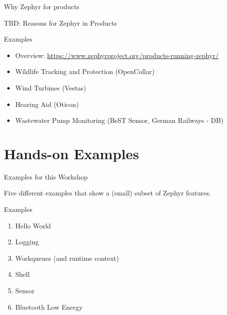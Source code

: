 \documentclass[10pt, aspectratio=169]{beamer}
\begin{document}
\begin{frame}[fragile]{Why Zephyr for products}

    TBD: Reasons for Zephyr in Products

  \begin{block}{Examples}
    \begin{itemize}
       \item Overview: {\scriptsize \url{https://www.zephyrproject.org/products-running-zephyr/}}
       \item Wildlife Tracking and Protection (OpenCollar)
       \item Wind Turbines (Vestas)
       \item Hearing Aid (Oticon)
       \item Wastewater Pump Monitoring (BeST Sensor, German Railways - DB)
    \end{itemize}
  \end{block}
\end{frame}

\section{Hands-on Examples}

\begin{frame}[fragile]{Examples for this Workshop}

  Five different examples that show a (small) subset of Zephyr features.

  \begin{block}{Examples}
    \begin{enumerate}
       \item Hello World
       \item Logging
       \item Workqueues (and runtime context)
       \item Shell
       \item Sensor
       \item Bluetooth Low Energy
    \end{enumerate}
  \end{block}
\end{frame}
\end{document}
